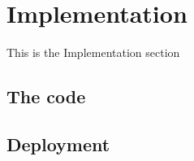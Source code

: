 \chapter{Implementation}
This is the Implementation section

\section{The code}

\section{Deployment}